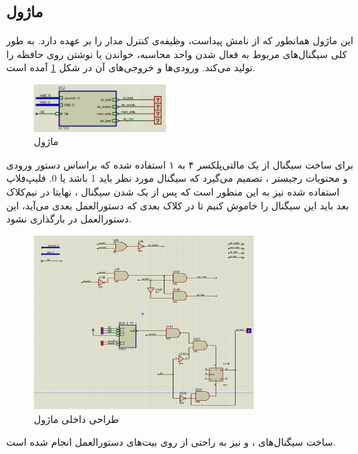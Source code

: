 \documentclass[12pt,onecolumn,a4paper,fleqn]{article}
\begin{document}
	\subsection{ماژول }
	این ماژول همانطور که از نامش پیداست، وظیفه‌ی کنترل مدار را بر عهده دارد. به طور کلی سیگنال‌های مربوط به فعال شدن واحد محاسبه، خواندن یا نوشتن روی حافظه را تولید می‌کند. ورودی‌ها و خروجی‌های آن در شکل \ref{fig:cu_interface} آمده است.
	\begin{figure}[H]
		\centering
		\includegraphics[width=0.45\textwidth]{source/cu_interface.png}
		\caption{ماژول }
		\label{fig:cu_interface}
	\end{figure}
	برای ساخت سیگنال 
	از یک مالتی‌پلکسر ۴ به ۱ استفاده شده که براساس دستور ورودی و محتویات رجیستر ، تصمیم می‌گیرد که سیگنال مورد نظر باید 1 باشد یا 0. فلیپ‌فلاپ استفاده شده نیز به این منظور است که پس از یک شدن سیگنال ، نهایتا در نیم‌کلاک بعد باید این سیگنال را خاموش کنیم تا در کلاک بعدی که دستورالعمل بعدی می‌آید، این دستورالعمل در  بارگذاری نشود.
	\begin{figure}[H]
		\centering
		\includegraphics[width=0.75\textwidth]{source/cu_inner.png}
		\caption{طراحی داخلی ماژول }
		\label{fig:cu_inner}
	\end{figure}
	ساخت سیگنال‌های
	،
	و
	نیز به راحتی از روی بیت‌های دستورالعمل انجام شده است.
	\pagebreak
\end{document}
